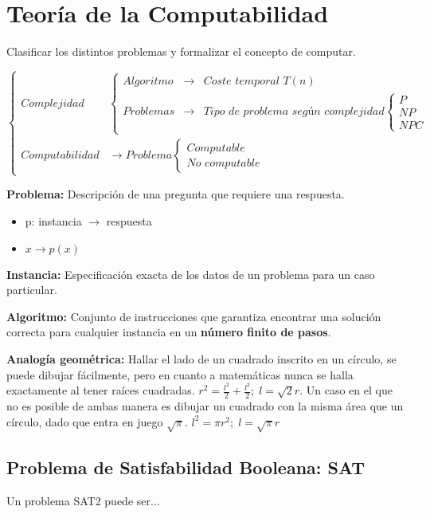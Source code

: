 \chapter{Teoría de la Computabilidad}\label{ch:teoria-de-la-computabilidad}
Clasificar los distintos problemas y formalizar el concepto de computar.

$\left\{\begin{matrix}
    Complejidad& \left\{\begin{matrix}
    Algoritmo &\rightarrow& \textit{Coste temporal } T(n)\\ 
    Problemas &\rightarrow& \textit{Tipo de problema según complejidad} \left\{\begin{matrix}
    P\\ 
    NP\\ 
    NPC
    \end{matrix}\right.
    \end{matrix}\right.\\ 
    Computabilidad& \rightarrow Problema \left\{\begin{matrix}
    Computable\\ 
    \textit{No computable}
    \end{matrix}\right.
    \end{matrix}\right.$

\textbf{Problema:} Descripción de una pregunta que requiere una respuesta.
\begin{itemize}
    \item p: instancia $\rightarrow$ respuesta
    \item $x \rightarrow p(x)$
\end{itemize}

\textbf{Instancia:} Especificación exacta de los datos de un problema para un caso particular.

\textbf{Algoritmo:} Conjunto de instrucciones que garantiza encontrar una solución correcta para cualquier instancia en un \textbf{número finito de pasos}.

\textbf{Analogía geométrica:} Hallar el lado de un cuadrado inscrito en un círculo, se puede dibujar fácilmente, pero en cuanto a matemáticas nunca se halla exactamente al tener raíces cuadradas. $r^2 = \frac{l^2}{2}+\frac{l^2}{2}; \; l= \sqrt{2}r$. Un caso en el que no es posible de ambas manera es dibujar un cuadrado con la misma área que un círculo, dado que entra en juego $\sqrt{\pi}$. $l^2 = \pi r^2; \; l = \sqrt{\pi}r$

\section{Problema de Satisfabilidad Booleana: SAT}
Un problema SAT2 puede ser...

